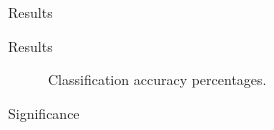 \documentclass[final,hyperref={pdfpagelabels=false}]{beamer}
\begin{document}
\begin{frame}[t]
\begin{columns}[t]
\begin{column}{.465\textwidth}
\begin{block}{Results}
     
\end{block}


\begin{block}{Results}

\begin{figure}[htb]
\centering
{}
\caption{Classification accuracy percentages.}
\label{fig:p300matrix}
\end{figure}
\end{block}


\begin{block}{Significance}


\end{block}
\end{column}
\end{columns}
\end{frame}
\end{document}
